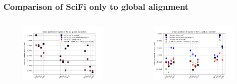 \documentclass[aspectratio=1610, 12pt, xcolor=dvipsnames]{beamer}
\begin{document}
\begin{frame}
\begin{columns}
\begin{column}[c]{0.5\textwidth}
\begin{figure}
      \end{figure}
    \end{column}
  \end{columns}
\end{frame}

\begin{frame}\frametitle{Comparison of SciFi only to global alignment}
  \begin{columns}
    \begin{column}[c]{0.48\textwidth}
      \begin{figure}
        \centering
        \includegraphics[width=\textwidth]{plots/outfiles_vs_global/all_runs_fix_glob_z_vs_local_Rx.pdf}
      \end{figure}
    \end{column}
    \begin{column}[c]{0.48\textwidth}
      \begin{figure}
        \centering
        \includegraphics[width=\textwidth]{plots/outfiles_vs_global/all_runs_fix_glob_z_vs_local_Rz.pdf}
      \end{figure}
    \end{column}
  \end{columns}
\end{frame}
\end{document}
